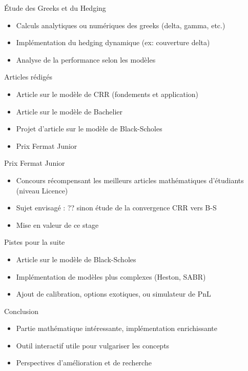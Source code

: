 \documentclass{beamer}
\begin{document}
\begin{frame}{Étude des Greeks et du Hedging}
\begin{itemize}
    \item Calculs analytiques ou numériques des greeks (delta, gamma, etc.)
    \item Implémentation du hedging dynamique (ex: couverture delta)
    \item Analyse de la performance selon les modèles
\end{itemize}
\end{frame}

\begin{frame}{Articles rédigés}
\begin{itemize}
    \item Article sur le modèle de CRR (fondements et application)
    \item Article sur le modèle de Bachelier
    \item Projet d’article sur le modèle de Black-Scholes
    \item Prix Fermat Junior
\end{itemize}
\end{frame}

\begin{frame}{Prix Fermat Junior}
\begin{itemize}
    \item Concours récompensant les meilleurs articles mathématiques d’étudiants (niveau Licence)
    \item Sujet envisagé : ?? sinon étude de la convergence CRR vers B-S
    \item Mise en valeur de ce stage
\end{itemize}
\end{frame}

\begin{frame}{Pistes pour la suite}
\begin{itemize}
    \item Article sur le modèle de Black-Scholes
    \item Implémentation de modèles plus complexes (Heston, SABR)
    \item Ajout de calibration, options exotiques, ou simulateur de PnL
\end{itemize}
\end{frame}

\begin{frame}{Conclusion}
\begin{itemize}
    \item Partie mathématique intéressante, implémentation enrichissante
    \item Outil interactif utile pour vulgariser les concepts
    \item Perspectives d'amélioration et de recherche
\end{itemize}
\end{frame}
\end{document}
